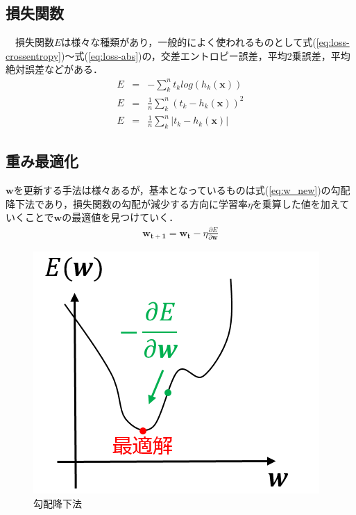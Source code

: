 \documentclass[a4j, 11pt]{jreport}
\newcommand{\eref}[1]{式(\ref{#1})}
\begin{document}
\subsection{損失関数}
　損失関数$E$は様々な種類があり，一般的によく使われるものとして\eref{eq:loss-crossentropy}～\eref{eq:loss-abs}の，交差エントロピー誤差，平均2乗誤差，平均絶対誤差などがある．
　\begin{eqnarray}
	E &=& -\sum_{k}^{n} t_k log(h_{k}(\bm x)) \label{eq:loss-crossentropy}　\\
	E &=& \frac{1}{n}\sum_{k}^{n}{( t_k - h_{k}(\bm x) )^2} \\
	E &=& \frac{1}{n}\sum_{k}^{n}| t_k - h_{k}(\bm x) | \label{eq:loss-abs}
\end{eqnarray}

\subsection{重み最適化}
$\bm{w}$を更新する手法は様々あるが，基本となっているものは\eref{eq:w_new}の勾配降下法であり，損失関数の勾配が減少する方向に学習率$\eta$を乗算した値を加えていくことで$\bm{w}$の最適値を見つけていく．
\begin{eqnarray}
	\label{eq:w_new}
	\bm{w_{t+1}} = \bm{w_{t}} - \eta \frac{\partial E}{\partial \bm{w}}
\end{eqnarray}
\begin{figure}[htbp]
	\begin{center}
		\includegraphics[scale=1]{./images/deeplearning/sgd.png}
		\caption{勾配降下法}
		\label{fig:sgd}
	\end{center}
\end{figure}
\end{document}
